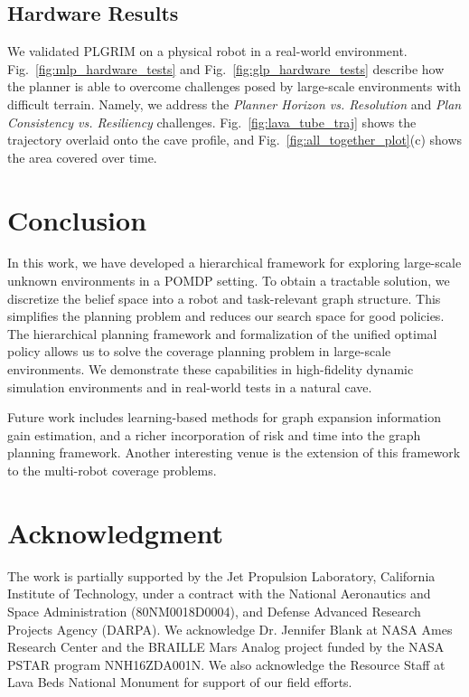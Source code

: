 \documentclass[letterpaper]{article} %
\begin{document}
\subsection{Hardware Results}
We validated PLGRIM on a physical robot in a real-world environment. Fig.~\ref{fig:mlp_hardware_tests} and Fig.~\ref{fig:glp_hardware_tests} describe how the planner is able to overcome challenges posed by large-scale environments with difficult terrain. Namely, we address the \textit{Planner Horizon vs. Resolution} and \textit{Plan Consistency vs. Resiliency} challenges. Fig.~\ref{fig:lava_tube_traj} shows the trajectory overlaid onto the cave profile, and Fig.~\ref{fig:all_together_plot}(c) shows the area covered over time.



\section{Conclusion}\label{sec:conclusion}

In this work, we have developed a hierarchical framework for exploring large-scale unknown environments in a POMDP setting. 
To obtain a tractable solution, we discretize the belief space into a robot and task-relevant graph structure. This simplifies the planning problem and reduces our search space for good policies.
The hierarchical planning framework and formalization of the unified optimal policy allows us to solve the coverage planning problem in large-scale environments.
We demonstrate these capabilities in high-fidelity dynamic simulation environments and in real-world tests in a natural cave.  

Future work includes learning-based methods for graph expansion information gain estimation, and a richer incorporation of risk and time into the graph planning framework.
Another interesting venue is the extension of this framework to the multi-robot coverage problems.


\section*{Acknowledgment}
The work is partially supported by the Jet Propulsion Laboratory, California Institute of Technology, under a contract with the National Aeronautics and Space Administration (80NM0018D0004), and Defense Advanced Research Projects Agency (DARPA).
We acknowledge Dr. Jennifer Blank at NASA Ames Research Center and
the BRAILLE Mars Analog project funded by the NASA PSTAR program NNH16ZDA001N.
We also acknowledge the Resource Staff at Lava Beds National Monument for support of our field efforts.




\end{document}
